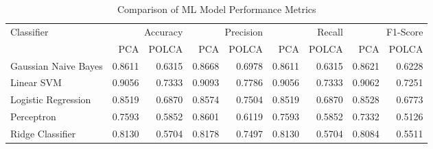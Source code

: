 \begin{table}[htbp]
\caption{Comparison of ML Model Performance Metrics}
\label{tab:model_comparison}
\begin{tabular}{lrrrrrrrr}
\toprule
Classifier & \multicolumn{2}{r}{Accuracy} & \multicolumn{2}{r}{Precision} & \multicolumn{2}{r}{Recall} & \multicolumn{2}{r}{F1-Score} \\
 & PCA & POLCA & PCA & POLCA & PCA & POLCA & PCA & POLCA \\
\midrule
Gaussian Naive Bayes & 0.8611 & 0.6315 & 0.8668 & 0.6978 & 0.8611 & 0.6315 & 0.8621 & 0.6228 \\
Linear SVM & 0.9056 & 0.7333 & 0.9093 & 0.7786 & 0.9056 & 0.7333 & 0.9062 & 0.7251 \\
Logistic Regression & 0.8519 & 0.6870 & 0.8574 & 0.7504 & 0.8519 & 0.6870 & 0.8528 & 0.6773 \\
Perceptron & 0.7593 & 0.5852 & 0.8601 & 0.6119 & 0.7593 & 0.5852 & 0.7332 & 0.5126 \\
Ridge Classifier & 0.8130 & 0.5704 & 0.8178 & 0.7497 & 0.8130 & 0.5704 & 0.8084 & 0.5511 \\
\bottomrule
\end{tabular}
\end{table}
